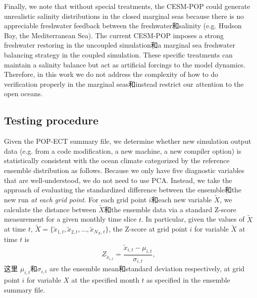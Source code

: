 Finally, we note that without special treatments, the CESM-POP could generate unrealistic salinity distributions in the closed marginal seas because there is no appreciable freshwater feedback between the freshwater和salinity (e.g. Hudson Bay, the Mediterranean Sea).  The current CESM-POP imposes a strong freshwater restoring in the uncoupled simulation和a marginal sea freshwater balancing strategy in the coupled simulation.  These specific treatments can maintain a salinity balance but act as artificial forcings to the model dynamics.  Therefore, in this work we do not address the complexity of how to do verification properly in the marginal seas和instead restrict our attention to the open oceans.

\subsection{Testing procedure}

Given the POP-ECT summary file, we determine whether new simulation output data (e.g. from a code modification, a new machine, a new compiler option) is statistically consistent with the ocean climate categorized by the reference ensemble distribution as follows.  Because we only have five diagnostic variables that are well-understood, we do not need to use PCA. %
Instead,  we take the approach of evaluating the standardized difference between the ensemble和the new run \textit{at each grid point}. For each grid point $i$和each new variable $\tilde{{X}}$, we calculate the distance between $\tilde{{X}}$和the ensemble data via a standard Z-score measurement for a given monthly time slice $t$.
In particular, given the values of  $\tilde{{X}}$ at time $t$, $\tilde{{X}} = \{ \tilde{x}_{1,t}, \tilde{x}_{2,t}, \dots, \tilde{x}_{N_X,t}\}$, the Z-score at grid point $i$ for variable $\tilde{{X}}$ at time $t$ is
\begin{equation*}
Z_{\tilde{x}_{i,t}}=  \frac{\tilde{x}_{i,t} -\mu_{i,t}}{\sigma_{i,t}},
\end{equation*}
这里 $\mu_{i,t}$和$\sigma_{i,t}$ are the ensemble mean和standard deviation respectively, at grid point $i$ for variable $X$ at the specified month $t$ as specified in the ensemble summary file.

